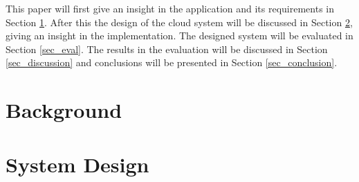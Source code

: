 \documentclass{acm_proc_article-sp}
\begin{document}
This paper will first give an insight in the application and its requirements in Section \ref{sec_bg}.
After this the design of the cloud system will be discussed in Section \ref{sec_system}, giving an insight in the implementation.
The designed system will be evaluated in Section \ref{sec_eval}.
The results in the evaluation will be discussed in Section \ref{sec_discussion} and conclusions will be presented in Section \ref{sec_conclusion}.

\section{Background}
\label{sec_bg}

\section{System Design}
\label{sec_system}

\end{document}
